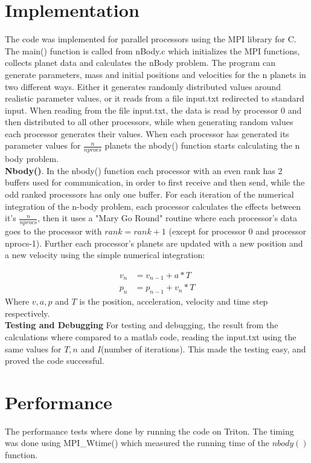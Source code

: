 \section{Implementation}
The code was implemented for parallel processors using the MPI library for C. The main() function is called from nBody.c which initializes the MPI functions, collects planet data and calculates the nBody problem. The program can generate parameters, mass and initial positions and velocities for the n planets in two different ways. Either it generates randomly distributed values around realistic parameter values, or it reads from a file input.txt redirected to standard input. When reading from the file input.txt, the data is read by processor 0 and then distributed to all other processors, while when generating random values each processor generates their values. When each processor has generated its parameter values for $\frac{n}{nprocs}$ planets the nbody() function starts calculating the n body problem. \\
\textbf{Nbody()}. In the nbody() function each processor with an even rank has 2 buffers used for communication, in order to first receive and then send, while the odd ranked processors has only one buffer. For each iteration of the numerical integration of the n-body problem, each processor calculates the effects between it's $\frac{n}{nprocs}$, then it uses a "Mary Go Round" routine where each processor's data goes to the processor with $rank=rank+1$ (except for processor 0 and processor nprocs-1). Further each processor's planets are updated with a new position and a new velocity using the simple numerical integration:

\begin{align}
\label{eq:}
 v_n&=v_{n-1}+a*T \\
p_n&=p_{n-1}+v_n*T
 \end{align}
Where $v, a, p$ and $T$ is the position, acceleration, velocity and time step respectively. \\
\textbf{Testing and Debugging}
For testing and debugging, the result from the calculations where compared to a matlab code, reading the input.txt using the same values for $T,n$ and $I$(number of iterations). This made
the testing easy, and proved the code successful. 


\section{Performance}
The performance tests where done by running the code on Triton. The timing was done using MPI\_Wtime() which measured the running time of  the $nbody()$ function. 






